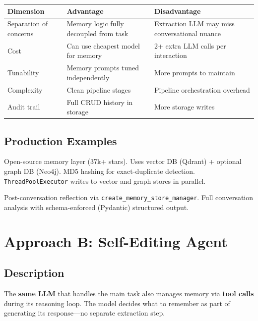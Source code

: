 \documentclass[11pt, letterpaper]{article}
\begin{document}
\begin{table}[h]
\centering
\begin{tabularx}{\textwidth}{lXX}
\toprule
\textbf{Dimension} & \textbf{Advantage} & \textbf{Disadvantage} \\
\midrule
Separation of concerns & Memory logic fully decoupled from task & Extraction LLM may miss conversational nuance \\
Cost & Can use cheapest model for memory & 2+ extra LLM calls per interaction \\
Tunability & Memory prompts tuned independently & More prompts to maintain \\
Complexity & Clean pipeline stages & Pipeline orchestration overhead \\
Audit trail & Full CRUD history in storage & More storage writes \\
\bottomrule
\end{tabularx}
\end{table}

\subsection{Production Examples}

\begin{description}[leftmargin=2em, style=nextline]
    \item[Mem0] Open-source memory layer (37k+ stars). Uses vector DB (Qdrant) +
        optional graph DB (Neo4j). MD5 hashing for exact-duplicate detection.
        \texttt{ThreadPoolExecutor} writes to vector and graph stores in parallel.
    \item[LangMem (background mode)] Post-conversation reflection via
        \texttt{create\_memory\_store\_manager}. Full conversation analysis with
        schema-enforced (Pydantic) structured output.
\end{description}

\section{Approach B: Self-Editing Agent}
\label{sec:self-editing}

\subsection{Description}

The \textbf{same LLM} that handles the main task also manages memory via \textbf{tool calls}
during its reasoning loop. The model decides what to remember as part of generating its
response---no separate extraction step.
\end{document}
